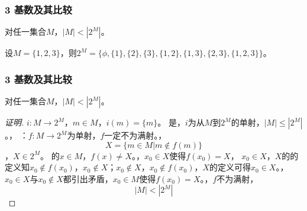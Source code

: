 \documentclass{beamer}
\begin{document}
\begin{CJK*}{UTF8}{gbsn}






\begin{frame}[t]
  \frametitle{3 基数及其比较}
  \begin{Thm}[康托]
    对任一集合$M$，$|M| < |2^{M}|$。
  \end{Thm}
\pause
  设$M=\{1,2,3\}$，则$2^{M}=\{\phi,\{1\},\{2\},\{3\},\{1,2\},\{1,3\},\{2,3\},\{1,2,3\}\}$。
\end{frame}
\begin{frame}[t]
  \frametitle{3 基数及其比较}
  \begin{Thm}[康托]
    对任一集合$M$，$|M| < |2^{M}|$。
  \end{Thm}
  \begin{proof}[证明]\justifying\let\raggedright\justifying
    $i:M\to 2^M$，$m\in M$，\pause$i(m)=\{m\}$。
    是，\pause$i$为从$M$到$2^M$的单射，$|M|\leq |2^M|$。，
    ：$f:M\to 2^M$为单射，$f$一定不为满射。，
    \[X=\{m\in M|m \notin f(m)\}\]，\pause$X\in 2^M$。
    的$x\in M$，\pause$f(x)\neq X$。，$x_0\in X$使得$f(x_0)=X$，
    $x_0\in X$，$X$的的定义知$x_0\notin
    f(x_0)$，$x_0\notin X$；$x_0\notin X$，$x_0\notin f(x_0)$，$X$的定义可得$x_0\in X$。，\pause$x_0\in X$与$x_0\notin X$都引出矛盾，$x_0\in M$使得$f(x_0)=X$。，\pause$f$不为满射，
    \[|M|<|2^M|\]
  \end{proof}
\end{frame}


\end{CJK*}
\end{document}
